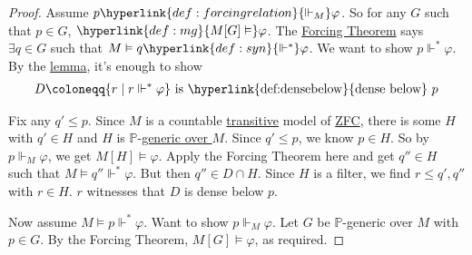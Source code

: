 \documentclass{article}
\newcommand{\1}{\mathbbm{1}}
\let\models\vDash
\let\forces\Vdash
\begin{document}
\begin{proof}
  Assume $p \hyperlink{def:forcingrelation}{\forces_M} \varphi$.
  So for any $G$ such that $p \in G$, $\hyperlink{def:mg}{M[G] \models} \varphi$.
  The \hyperlink{thm:forcing}{Forcing Theorem} says $\exists q \in G$ such that $M \models q \hyperlink{def:syn}{\forces^*} \varphi$.
  We want to show $p \Vdash^* \varphi$.
  By the \hyperlink{lem:forc}{lemma}, it's enough to show
  \begin{align*}
    D \coloneqq \{r \mid r \forces^* \varphi\} \text{ is \hyperlink{def:densebelow}{dense below} } p
  \end{align*}

  Fix any $q' \leq p$.
  Since $M$ is a countable \hyperlink{def:transitive}{transitive} model of \hyperlink{def:axioms}{\textsf{ZFC}}, there is some $H$ with $q' \in H$ and $H$ is $\mathbb{P}$-\hyperlink{def:genericO}{generic over $M$}.
  Since $q' \leq p$, we know $p \in H$.
  So by $p \forces_M \varphi$, we get $M[H] \models \varphi$.
  Apply the Forcing Theorem here and get $q'' \in H$ such that $M \models q'' \forces^* \varphi$.
  But then $q'' \in D \cap H$. Since $H$ is a filter, we find $r \leq q', q''$ with $r \in H$.
  $r$ witnesses that $D$ is dense below $p$.

  Now assume $M \models p \forces^* \varphi$.
  Want to show $p \forces_M \varphi$.
  Let $G$ be $\mathbb{P}$-generic over $M$ with $p \in G$. By the Forcing Theorem, $M[G] \models \varphi$, as required.
\end{proof}
\end{document}
